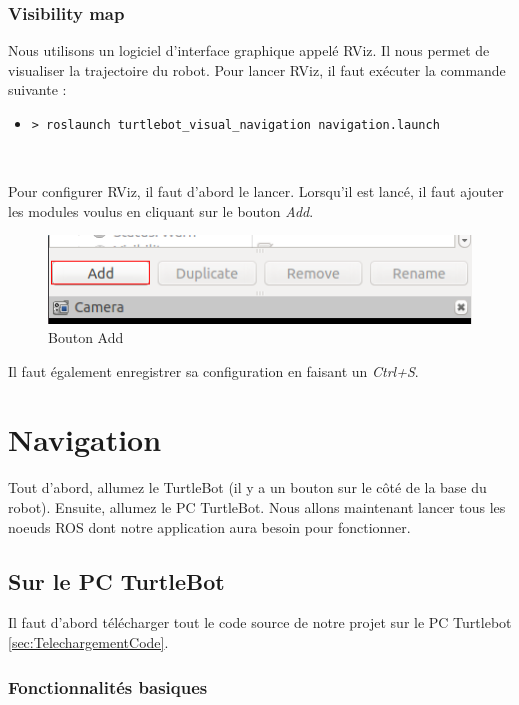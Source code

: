 \documentclass[10pt,a4paper]{article}
\begin{document}
\subsubsection{Visibility map}
\label{sec:visibilityMap}

Nous utilisons un logiciel d'interface graphique appelé RViz. Il nous permet de visualiser la trajectoire du robot. Pour lancer RViz, il faut exécuter la commande suivante :
\begin{itemize}
\item[] \begin{verbatim}> roslaunch turtlebot_visual_navigation navigation.launch \end{verbatim}\\
\end{itemize}
Pour configurer RViz, il faut d'abord le lancer. Lorsqu'il est lancé, il faut ajouter les modules voulus en cliquant sur le bouton \upshape \emph{Add}. \\
\newpage
\begin{figure}[h]
 \center
 \includegraphics[scale=0.5]{Add.png}
 \caption{Bouton Add}
\end{figure}
Il faut également enregistrer sa configuration en faisant un \upshape \emph{Ctrl+S}.



\section{Navigation}
\label{sec:Navigation}

Tout d'abord, allumez le TurtleBot (il y a un bouton sur le côté de la base du robot). Ensuite, allumez le PC TurtleBot. Nous allons maintenant lancer tous les noeuds ROS dont notre application aura besoin pour fonctionner.

\subsection{Sur le PC TurtleBot}

Il faut d'abord télécharger tout le code source de notre projet sur le PC Turtlebot \ref{sec:TelechargementCode}.


\subsubsection{Fonctionnalités basiques}
\label{sec:navigation2}
\end{document}
